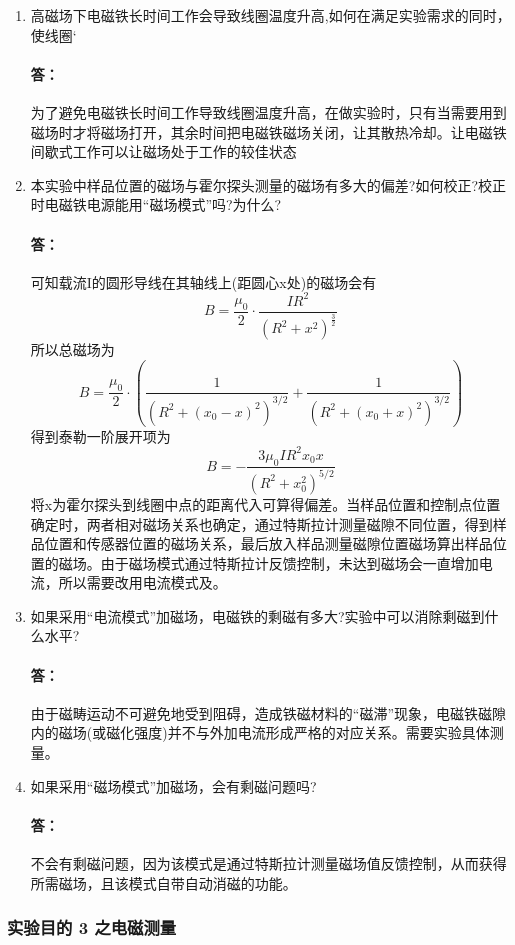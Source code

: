 \documentclass{ctexart}                                     %
\theoremstyle{ansstyle}
\begin{document}
\begin{enumerate}

    \item 高磁场下电磁铁长时间工作会导致线圈温度升高,如何在满足实验需求的同时，使线圈`
          \paragraph{答：}为了避免电磁铁长时间工作导致线圈温度升高，在做实验时，只有当需要用到磁场时才将磁场打开，其余时间把电磁铁磁场关闭，让其散热冷却。让电磁铁间歇式工作可以让磁场处于工作的较佳状态
    \item 本实验中样品位置的磁场与霍尔探头测量的磁场有多大的偏差?如何校正?校正时电磁铁电源能用“磁场模式”吗?为什么?
          \paragraph{答：}可知载流I的圆形导线在其轴线上(距圆心x处)的磁场会有
          $$B=\frac{\mu_{0}}{2}\cdot \frac{IR^{2}}{(R^{2}+x^{2})^{\frac{3}{2}}}$$
          所以总磁场为
          $$B=\frac{\mu_{0}}{2}\cdot (\frac{1}{(R^{2}+(x_{0}-x)^{2})^{3/2}}+\frac{1}{(R^{2}+(x_{0}+x)^{2})^{3/2}})$$
          得到泰勒一阶展开项为$$B=-\frac{3\mu_{0}IR^{2}x_{0}x}{(R^{2}+x_{0}^{2})^{5/2}}$$
          将x为霍尔探头到线圈中点的距离代入可算得偏差。当样品位置和控制点位置确定时，两者相对磁场关系也确定，通过特斯拉计测量磁隙不同位置，得到样品位置和传感器位置的磁场关系，最后放入样品测量磁隙位置磁场算出样品位置的磁场。由于磁场模式通过特斯拉计反馈控制，未达到磁场会一直增加电流，所以需要改用电流模式及。
    \item 如果采用“电流模式”加磁场，电磁铁的剩磁有多大?实验中可以消除剩磁到什么水平?
          \paragraph{答：}由于磁畴运动不可避免地受到阻碍，造成铁磁材料的“磁滞”现象，电磁铁磁隙内的磁场(或磁化强度)并不与外加电流形成严格的对应关系。需要实验具体测量。
    \item 如果采用“磁场模式”加磁场，会有剩磁问题吗?
          \paragraph{答：}不会有剩磁问题，因为该模式是通过特斯拉计测量磁场值反馈控制，从而获得所需磁场，且该模式自带自动消磁的功能。


\end{enumerate}
\subsubsection{实验目的 3 之电磁测量}
\end{document}
